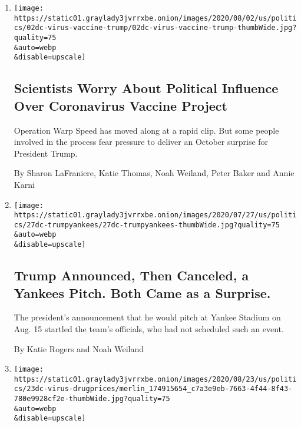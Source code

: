 \begin{enumerate}
\def\labelenumi{\arabic{enumi}.}
\item
  \href{/2020/08/02/us/politics/coronavirus-vaccine.html}{}

  \texttt{[image: https://static01.graylady3jvrrxbe.onion/images/2020/08/02/us/politics/02dc-virus-vaccine-trump/02dc-virus-vaccine-trump-thumbWide.jpg?quality=75\\\&auto=webp\\\&disable=upscale]}

  \hypertarget{scientists-worry-about-political-influence-over-coronavirus-vaccine-project}{%
  \subsection{Scientists Worry About Political Influence Over
  Coronavirus Vaccine
  Project}\label{scientists-worry-about-political-influence-over-coronavirus-vaccine-project}}

  Operation Warp Speed has moved along at a rapid clip. But some people
  involved in the process fear pressure to deliver an October surprise
  for President Trump.

  By Sharon LaFraniere, Katie Thomas, Noah Weiland, Peter Baker and
  Annie Karni
\item
  \href{/2020/07/27/us/politics/trump-yankees-fauci.html}{}

  \texttt{[image: https://static01.graylady3jvrrxbe.onion/images/2020/07/27/us/politics/27dc-trumpyankees/27dc-trumpyankees-thumbWide.jpg?quality=75\\\&auto=webp\\\&disable=upscale]}

  \hypertarget{trump-announced-then-canceled-a-yankees-pitch-both-came-as-a-surprise}{%
  \subsection{Trump Announced, Then Canceled, a Yankees Pitch. Both Came
  as a
  Surprise.}\label{trump-announced-then-canceled-a-yankees-pitch-both-came-as-a-surprise}}

  The president's announcement that he would pitch at Yankee Stadium on
  Aug. 15 startled the team's officials, who had not scheduled such an
  event.

  By Katie Rogers and Noah Weiland
\item
  \href{/2020/07/24/us/politics/trump-drug-prices-coronavirus.html}{}

  \texttt{[image: https://static01.graylady3jvrrxbe.onion/images/2020/08/23/us/politics/23dc-virus-drugprices/merlin\_174915654\_c7a3e9eb-7663-4f44-8f43-780e9928cf2e-thumbWide.jpg?quality=75\\\&auto=webp\\\&disable=upscale]}


\end{enumerate}

